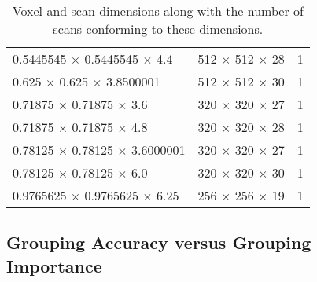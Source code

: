 \begin{table}[H]
\begin{tabularx}{\textwidth}{X X r}
    \num{0.5445545} $ \times $ \num{0.5445545} $ \times $ \num{4.4}          &   \num[minimum-decimal-digits=0,drop-zero-decimal]{512} $ \times $ \num[minimum-decimal-digits=0,drop-zero-decimal]{512} $ \times $ \num[minimum-decimal-digits=0,drop-zero-decimal]{28}  & 1\\
    \num{0.625} $ \times $ \num{0.625} $ \times $ \num{3.8500001}            &   \num[minimum-decimal-digits=0,drop-zero-decimal]{512} $ \times $ \num[minimum-decimal-digits=0,drop-zero-decimal]{512} $ \times $ \num[minimum-decimal-digits=0,drop-zero-decimal]{30}  & 1\\
    \num{0.71875} $ \times $ \num{0.71875} $ \times $ \num{3.6}              &   \num[minimum-decimal-digits=0,drop-zero-decimal]{320} $ \times $ \num[minimum-decimal-digits=0,drop-zero-decimal]{320} $ \times $ \num[minimum-decimal-digits=0,drop-zero-decimal]{27}  & 1\\
    \num{0.71875} $ \times $ \num{0.71875} $ \times $ \num{4.8}              &   \num[minimum-decimal-digits=0,drop-zero-decimal]{320} $ \times $ \num[minimum-decimal-digits=0,drop-zero-decimal]{320} $ \times $ \num[minimum-decimal-digits=0,drop-zero-decimal]{28}  & 1\\
    \num{0.78125} $ \times $ \num{0.78125} $ \times $ \num{3.6000001}        &   \num[minimum-decimal-digits=0,drop-zero-decimal]{320} $ \times $ \num[minimum-decimal-digits=0,drop-zero-decimal]{320} $ \times $ \num[minimum-decimal-digits=0,drop-zero-decimal]{27}  & 1\\
    \num{0.78125} $ \times $ \num{0.78125} $ \times $ \num{6.0}              &   \num[minimum-decimal-digits=0,drop-zero-decimal]{320} $ \times $ \num[minimum-decimal-digits=0,drop-zero-decimal]{320} $ \times $ \num[minimum-decimal-digits=0,drop-zero-decimal]{30}  & 1\\
    \num{0.9765625} $ \times $ \num{0.9765625} $ \times $ \num{6.25}         &   \num[minimum-decimal-digits=0,drop-zero-decimal]{256} $ \times $ \num[minimum-decimal-digits=0,drop-zero-decimal]{256} $ \times $ \num[minimum-decimal-digits=0,drop-zero-decimal]{19}  & 1\\       
  \end{tabularx}
  \caption{Voxel and scan dimensions along with the number of scans conforming to these dimensions.}\label{tbl:scan_dimensions}
\end{table}


\subsection{Grouping Accuracy versus Grouping Importance}\label{sec:accuracy_vs_importance}

